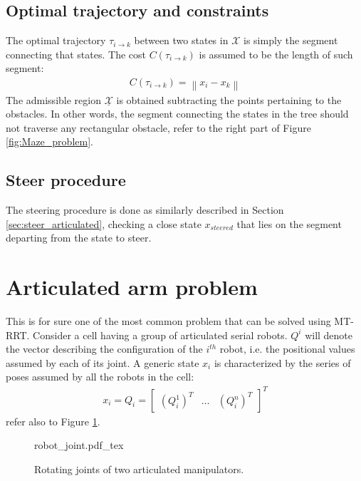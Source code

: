 \subsection{Optimal trajectory and constraints}
\label{sec:traj_maze}

The optimal trajectory $\tau_{i \rightarrow k}$ between two states in $\mathcal{X}$ is simply the segment connecting that states. 
The cost $C(\tau_{i \rightarrow k})$ is assumed to be the length of such segment:
\begin{eqnarray}
C(\tau_{i \rightarrow k}) = \left \| x_i - x_k \right \|
\end{eqnarray}
The admissible region $\underline{\mathcal{X}}$ is obtained subtracting the points pertaining to the obstacles. In other words, the segment connecting the states in the tree should not traverse any rectangular obstacle, refer to the right part of Figure \ref{fig:Maze_problem}.

\subsection{Steer procedure}

The steering procedure is done as similarly described in Section \ref{sec:steer_articulated}, checking a close state $x_{steered}$ that lies on the segment departing from the state to steer.

\section{Articulated arm problem}

This is for sure one of the most common problem that can be solved using MT-RRT. Consider a cell having a group of articulated serial robots.
$Q^{i}$ will denote the vector describing the configuration of the $i^{th}$ robot, i.e. the positional values assumed by each of its joint.
A generic state $x_i$ is characterized by the series of poses assumed by all the robots in the cell:
\begin{eqnarray}
x_i = Q_i = \begin{bmatrix} (Q^1_i)^T & \hdots & (Q^n_i)^T \end{bmatrix}^T
\end{eqnarray}
refer also to Figure \ref{fig:q_example}.

 \begin{figure}
	 \centering
 \def\svgwidth{0.8 \columnwidth}
 {robot_joint.pdf_tex} 
	 \caption{Rotating joints of two articulated manipulators.}
 \label{fig:q_example}
 \end{figure}

